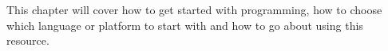This chapter will cover how to get started with programming, how to choose which language or platform to start with and how to go about
using this resource.
